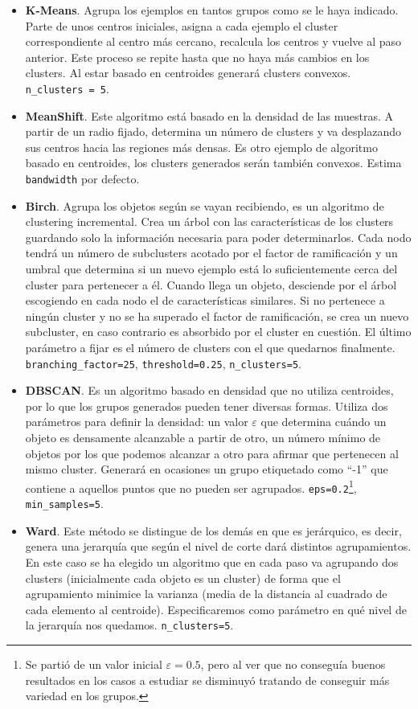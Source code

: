 \documentclass[a4paper, 20pt]{article}
\begin{document}
\begin{itemize}
\item \textbf{K-Means}. Agrupa los ejemplos en tantos grupos como se le haya indicado. Parte de unos centros iniciales, asigna a cada ejemplo el cluster correspondiente al centro más cercano, recalcula los centros y vuelve al paso anterior. Este proceso se repite hasta que no haya más cambios en los clusters. Al estar basado en centroides generará clusters convexos. \texttt{n\_clusters = 5}.
\item \textbf{MeanShift}. Este algoritmo está basado en la densidad de las muestras. A partir de un radio fijado, determina un número de clusters y va desplazando sus centros hacia las regiones más densas. Es otro ejemplo de algoritmo basado en centroides, los clusters generados serán también convexos. Estima \texttt{bandwidth} por defecto.
\item \textbf{Birch}. Agrupa los objetos según se vayan recibiendo, es un algoritmo de clustering incremental. Crea un árbol con las características de los clusters guardando solo la información necesaria para poder determinarlos. Cada nodo tendrá un número de subclusters acotado por el factor de ramificación y un umbral que determina si un nuevo ejemplo está lo suficientemente cerca del cluster para pertenecer a él. Cuando llega un objeto, desciende por el árbol escogiendo en cada nodo el de características similares. Si no pertenece a ningún cluster y no se ha superado el factor de ramificación, se crea un nuevo subcluster, en caso contrario es absorbido por el cluster en cuestión. El último parámetro a fijar es el número de clusters con el que quedarnos finalmente. \texttt{branching\_factor=25}, \texttt{threshold=0.25}, \texttt{n\_clusters=5}.
\item \textbf{DBSCAN}. Es un algoritmo basado en densidad que no utiliza centroides, por lo que los grupos generados pueden tener diversas formas. Utiliza dos parámetros para definir la densidad: un valor $\varepsilon$ que determina cuándo un objeto es densamente alcanzable a partir de otro, un número mínimo de objetos por los que podemos alcanzar a otro para afirmar que pertenecen al mismo cluster. Generará en ocasiones un grupo etiquetado como ``-1'' que contiene a aquellos puntos que no pueden ser agrupados. \texttt{eps=0.2}\footnote{Se partió de un valor inicial $\varepsilon = 0.5$,  pero al ver que no conseguía buenos resultados en los casos a estudiar se disminuyó tratando de conseguir más variedad en los grupos.}, \texttt{min\_samples=5}.
\item \textbf{Ward}. Este método se distingue de los demás en que es jerárquico, es decir, genera una jerarquía que según el nivel de corte dará distintos agrupamientos. En este caso se ha elegido un algoritmo que en cada paso va agrupando dos clusters (inicialmente cada objeto es un cluster) de forma que el agrupamiento minimice la varianza (media de la distancia al cuadrado de cada elemento al centroide). Especificaremos como parámetro en qué nivel de la jerarquía nos quedamos. \texttt{n\_clusters=5}.
\end{itemize}
\end{document}

